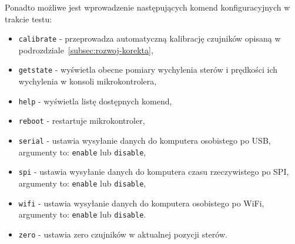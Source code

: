 Ponadto możliwe jest wprowadzenie następujących komend konfiguracyjnych w trakcie testu:
\begin{itemize}
    \item \texttt{calibrate} - przeprowadza automatyczną kalibrację czujników opisaną w podrozdziale~\ref{subsec:rozwoj-korekta},
    \item \texttt{getstate} - wyświetla obecne pomiary wychylenia sterów i prędkości ich wychylenia w konsoli mikrokontrolera,
    \item \texttt{help} - wyświetla listę dostępnych komend,
    \item \texttt{reboot} - restartuje mikrokontroler,
    \item \texttt{serial} - ustawia wysyłanie danych do komputera osobistego po USB, argumenty to: \texttt{enable} lub \texttt{disable},
    \item \texttt{spi} - ustawia wysyłanie danych do komputera czasu rzeczywistego po SPI, argumenty to: \texttt{enable} lub \texttt{disable},
    \item \texttt{wifi} - ustawia wysyłanie danych do komputera osobistego po WiFi, argumenty to: \texttt{enable} lub \texttt{disable}.
    \item \texttt{zero} - ustawia zero czujników w aktualnej pozycji sterów.
\end{itemize}